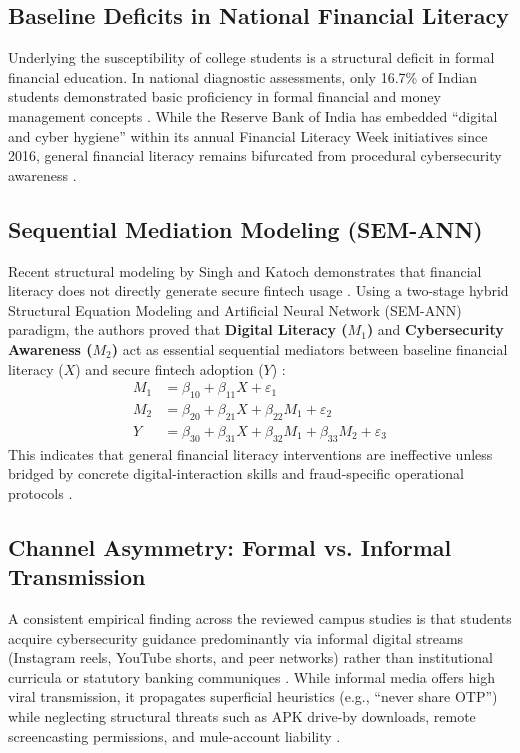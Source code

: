 \documentclass[journal,10pt,twocolumn]{IEEEtran}
\begin{document}
\subsection{Baseline Deficits in National Financial Literacy}
Underlying the susceptibility of college students is a structural deficit in formal financial education. In national diagnostic assessments, only 16.7\% of Indian students demonstrated basic proficiency in formal financial and money management concepts \cite{iosr2025}. While the Reserve Bank of India has embedded ``digital and cyber hygiene'' within its annual Financial Literacy Week initiatives since 2016, general financial literacy remains bifurcated from procedural cybersecurity awareness \cite{iosr2025, priyanka2025}.

\subsection{Sequential Mediation Modeling (SEM-ANN)}
Recent structural modeling by Singh and Katoch demonstrates that financial literacy does not directly generate secure fintech usage \cite{singh2025}. Using a two-stage hybrid Structural Equation Modeling and Artificial Neural Network (SEM-ANN) paradigm, the authors proved that \textbf{Digital Literacy ($M_1$)} and \textbf{Cybersecurity Awareness ($M_2$)} act as essential sequential mediators between baseline financial literacy ($X$) and secure fintech adoption ($Y$) \cite{singh2025}:
\begin{equation}
\begin{aligned}
M_1 &= \beta_{10} + \beta_{11} X + \varepsilon_1 \\
M_2 &= \beta_{20} + \beta_{21} X + \beta_{22} M_1 + \varepsilon_2 \\
Y   &= \beta_{30} + \beta_{31} X + \beta_{32} M_1 + \beta_{33} M_2 + \varepsilon_3
\end{aligned}
\end{equation}
This indicates that general financial literacy interventions are ineffective unless bridged by concrete digital-interaction skills and fraud-specific operational protocols \cite{singh2025}.

\subsection{Channel Asymmetry: Formal vs. Informal Transmission}
A consistent empirical finding across the reviewed campus studies is that students acquire cybersecurity guidance predominantly via informal digital streams (Instagram reels, YouTube shorts, and peer networks) rather than institutional curricula or statutory banking communiques \cite{exploratio2026, priyanka2025}. While informal media offers high viral transmission, it propagates superficial heuristics (e.g., ``never share OTP'') while neglecting structural threats such as APK drive-by downloads, remote screencasting permissions, and mule-account liability \cite{mukhopadhyay2024, priyanka2025}.
\end{document}

